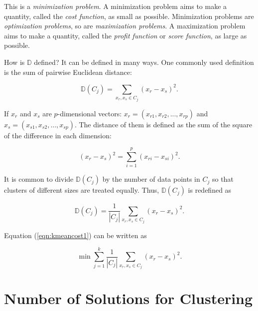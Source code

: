 This is a {\it minimization problem}. A minimization problem aims to
make a quantity, called the {\it cost function}, as small as possible.
Minimization problems are {\it optimization problems}, so are {\it
  maximization problems}.  A maximization problem aims to make a
quantity, called the {\it profit function} or {\it score function}, as
large as possible.


How is $\mathds{D}$ defined?  It can be defined in many ways. One commonly
used definition is the sum of pairwise Euclidean distance:


\begin{equation}
\mathds{D}(C_j) = \underset{x_r, x_s \in C_j}{\sum} (x_r - x_s)^ 2.
\end{equation}

If $x_r$ and $x_s$ are $p$-dimensional vectors:
$x_r = (x_{r1}, x_{r2}, ..., x_{rp})$ and
$x_s = (x_{s1}, x_{s2}, ..., x_{sp})$.
The distance of them is defined as the sum of the square
of the difference in each dimension:

\begin{equation}
(x_r - x_s)^ 2 = \underset{i = 1}{\overset{p}{\sum}} (x_{ri} - x_{si})^2.
\end{equation}

It is common to divide $\mathds{D}(C_j)$ by the number of data points
in $C_j$ so that clusters of different sizes
are treated equally. Thus, $\mathds{D}(C_j)$ is redefined as

\begin{equation}
\mathds{D}(C_j) = \frac{1}{|C_j|} \underset{x_r, x_s \in C_j}{\sum} (x_r - x_s)^ 2.
\end{equation}

Equation (\ref{eqn:kmeancost1}) can be written as

\begin{equation}
\min \underset{j = 1}{\overset{k}{\sum}}  \frac{1}{|C_j|} \underset{x_r, x_s \in C_j}{\sum} (x_r - x_s)^ 2.
\end{equation}


\section{Number of Solutions for Clustering}

